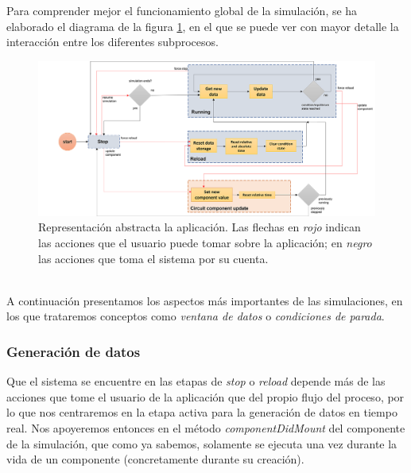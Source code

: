 \documentclass[../main.tex]{subfiles}
\begin{document}
Para comprender mejor el funcionamiento global de la simulación, se ha elaborado el diagrama de la figura \ref{fig::diagrama-algoritmo}, en el que se puede ver con mayor detalle la interacción entre los diferentes subprocesos.


\begin{figure}[!h]
    \centering
    \includegraphics[width=\textwidth]{images/diagrama-algoritmo.png}
    \caption{Representación abstracta la aplicación. Las flechas en \textit{rojo} indican las acciones que el usuario puede tomar sobre la aplicación; en \textit{negro} las acciones que toma el sistema por su cuenta. }
    \label{fig::diagrama-algoritmo}
\end{figure}

\hphantom{1}\\
 A continuación presentamos los aspectos más importantes de las simulaciones, en los que trataremos conceptos como \textit{ventana de datos} o \textit{condiciones de parada}.

\subsubsection{Generación de datos}
Que el sistema se encuentre en las etapas de \textit{stop} o \textit{reload} depende más de las acciones que tome el usuario de la aplicación que del propio flujo del proceso, por lo que nos centraremos en la etapa activa para la generación de datos en tiempo real. Nos apoyeremos entonces en el método \textit{componentDidMount} del componente de la simulación, que como ya sabemos, solamente se ejecuta una vez durante la vida de un componente (concretamente durante su creación). \\
\end{document}
